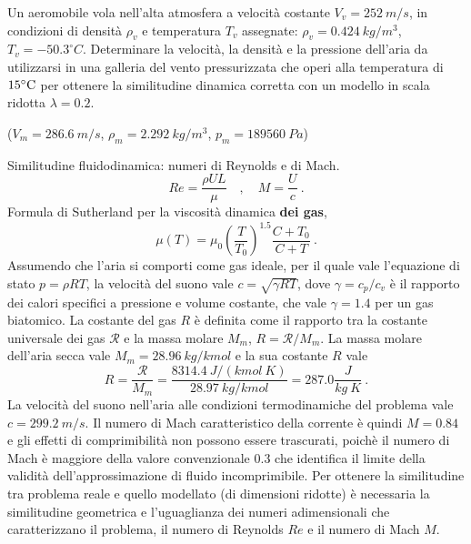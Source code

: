 \noindent
\begin{exerciseS}
Un aeromobile vola nell'alta atmosfera a velocit\`{a} costante $V_v=252\  m/s$,
in condizioni di densit\`{a} $\rho_v$ e temperatura $T_v$ assegnate: 
$\rho_v = 0.424\ kg/m^3$, $T_v = -50.3^\circ  C$.
%
\newline
Determinare la velocit\`{a}, la densit\`{a} e la pressione dell'aria da utilizzarsi 
in una galleria del vento pressurizzata che operi alla temperatura di $15^\circ {\rm C}$
per ottenere la similitudine dinamica corretta con un modello in scala ridotta $\lambda = 0.2$.

($V_m = 286.6\ m/s$, $\rho_m = 2.292\ kg/m^3$, $p_m= 189560\ Pa$)
\end{exerciseS}

\sol
%
\partone
Similitudine fluidodinamica: numeri di Reynolds e di Mach.
\begin{equation}
 Re = \frac{\rho U L}{\mu} \quad , \quad M = \frac{U}{c} \ .
\end{equation}
Formula di Sutherland per la viscosità dinamica \textbf{dei gas},
\begin{equation}
 \mu(T) = \mu_0 \displaystyle\left(\frac{T}{T_0}\right)^{1.5}
 \frac{C+T_0}{C+T} \ .
\end{equation}
%
\parttwo
Assumendo che l'aria si comporti come gas ideale, per il quale vale l'equazione di stato $p = \rho R T$, la velocità del suono vale $c = \sqrt{\gamma R T}$, dove $\gamma = c_p / c_v$ è il rapporto dei calori specifici a pressione e volume costante, che vale $\gamma = 1.4$ per un gas biatomico. La costante del gas $R$ è definita come il rapporto tra la costante universale dei gas $\mathscr{R}$ e la massa molare $M_m$, $R = \mathscr{R}/M_m$.
La massa molare dell'aria secca vale $M_m = 28.96 \ kg / kmol$ e la sua costante $R$ vale
\begin{equation}
 R = \dfrac{\mathscr{R}}{M_m} = \dfrac{8314.4 \ J / (kmol \ K)}{28.97 \ kg/kmol} = 287.0 \dfrac{J }{kg \ K} \ .
\end{equation}
La velocità del suono nell'aria alle condizioni termodinamiche del problema vale $c = 299.2 \ m/s$. Il numero di Mach caratteristico della corrente è quindi $M=0.84$ e gli effetti di comprimibilità non possono essere trascurati, poichè il numero di Mach è maggiore della valore convenzionale $0.3$ che identifica il limite della validità dell'approssimazione di fluido incomprimibile.
%
Per ottenere la similitudine tra problema reale e quello modellato (di dimensioni ridotte) è necessaria la similitudine geometrica e l'uguaglianza dei numeri adimensionali che caratterizzano il problema, il numero di Reynolds $Re$ e il numero di Mach $M$.
